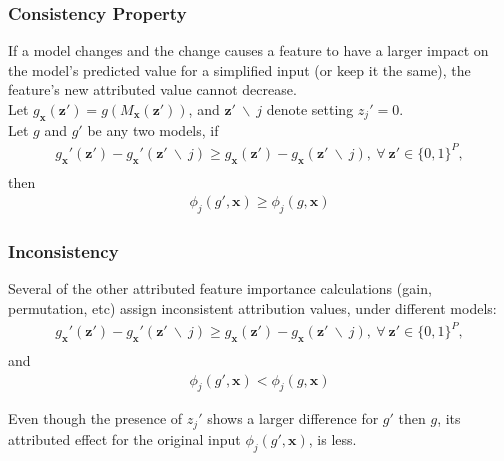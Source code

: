 
\begin{frame}\frametitle{Consistency Property}
If a model changes and the change causes a feature to have a larger impact on the model's predicted value for a simplified input (or keep it the same), the feature's new attributed value cannot decrease.\\
\vspace{\baselineskip}
Let $g_\mathbf{x}(\mathbf{z'}) = g(M_\mathbf{x}(\mathbf{z'}))$, and $\mathbf{z'} \: \backslash \: j$ denote setting $z_j' = 0$.\\
\vspace{\baselineskip}
Let  $g$ and $g'$ be any two models, if\\
	\begin{equation}
	\begin{aligned}	
		g_\mathbf{x}'(\mathbf{z'}) - g_\mathbf{x}'(\mathbf{z'} \: \backslash \: j) \geq g_\mathbf{x}(\mathbf{z'}) - g_\mathbf{x}(\mathbf{z'} \: \backslash \: j), \: \forall \: \mathbf{z'} \in \{0,1\}^P,\\
	\end{aligned}
	\end{equation}
then 
	\begin{equation}
	\begin{aligned}			
		\phi_j(g', \mathbf{x}) \geq  \phi_j(g, \mathbf{x})
	\end{aligned}
	\end{equation}



\end{frame}


\begin{frame}\frametitle{Inconsistency}

Several of the other attributed feature importance calculations (gain, permutation, etc) assign inconsistent attribution values, under different models:
	\begin{equation}
	\begin{aligned}	
		g_\mathbf{x}'(\mathbf{z'}) - g_\mathbf{x}'(\mathbf{z'} \: \backslash \: j) \geq g_\mathbf{x}(\mathbf{z'}) - g_\mathbf{x}(\mathbf{z'} \: \backslash \: j), \: \forall \: \mathbf{z'} \in \{0,1\}^P,\\
	\end{aligned}
	\end{equation}
and 
	\begin{equation}
	\begin{aligned}			
		\phi_j(g', \mathbf{x}) <  \phi_j(g, \mathbf{x})
	\end{aligned}
	\end{equation}

Even though the presence of $z_j' $ shows a larger difference for $g'$ then $g$, its attributed effect for the original input $\phi_j(g', \mathbf{x})$, is less. 

\end{frame}


